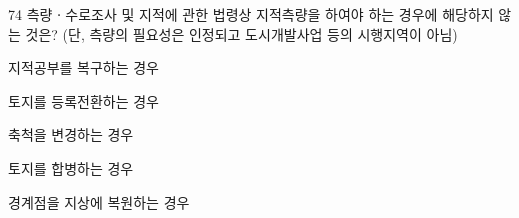 \begin{question}{74}
측량ㆍ수로조사 및 지적에 관한 법령상 지적측량을 하여야 하는 경우에 해당하지 않는 것은? (단, 측량의 필요성은 인정되고 도시개발사업 등의 시행지역이 아님)
\begin{choices}
  \item 지적공부를 복구하는 경우
  \item 토지를 등록전환하는 경우
  \item 축척을 변경하는 경우
  \item 토지를 합병하는 경우
  \item 경계점을 지상에 복원하는 경우
\end{choices}
\end{question}

